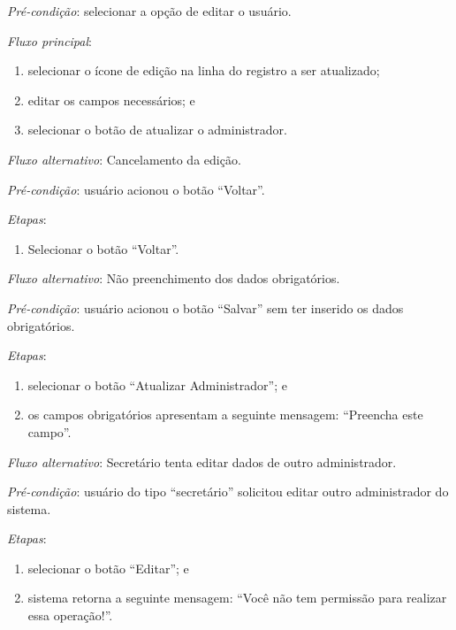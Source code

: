 \documentclass[a4paper,12pt]{article}
\begin{document}
\vspace{0.7cm}

\noindent \textit{Pré-condição}: selecionar a opção de editar o usuário.

\noindent \textit{Fluxo principal}:

\begin{enumerate}
    \item selecionar o ícone de edição na linha do registro a ser atualizado;
    \item editar os campos necessários; e
    \item selecionar o botão de atualizar o administrador.
\end{enumerate}

\noindent \textit{Fluxo alternativo}: Cancelamento da edição.

\noindent \textit{Pré-condição}: usuário acionou o botão ``Voltar''.

\noindent \textit{Etapas}:

\begin{enumerate}
    \item Selecionar o botão ``Voltar''.
\end{enumerate}

\noindent \textit{Fluxo alternativo}: Não preenchimento dos dados obrigatórios.

\noindent \textit{Pré-condição}: usuário acionou o botão ``Salvar'' sem ter inserido os dados obrigatórios.

\noindent \textit{Etapas}:

\begin{enumerate}
    \item selecionar o botão ``Atualizar Administrador''; e
    \item os campos obrigatórios apresentam a seguinte mensagem: ``Preencha este campo''.
\end{enumerate}



\noindent \textit{Fluxo alternativo}: Secretário tenta editar dados de outro administrador.

\noindent \textit{Pré-condição}: usuário do tipo ``secretário'' solicitou editar outro administrador do sistema.

\noindent \textit{Etapas}:

\begin{enumerate}
    \item selecionar o botão ``Editar''; e
    \item sistema retorna a seguinte mensagem: ``Você não tem permissão para realizar essa operação!''.
\end{enumerate}
\end{document}

